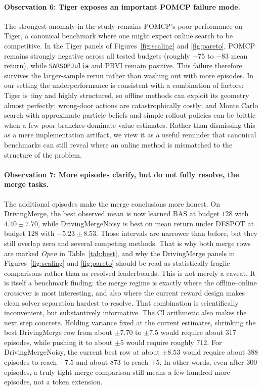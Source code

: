 \documentclass[10pt,twocolumn]{article}
\begin{document}
\paragraph{Observation 6: Tiger exposes an important POMCP failure mode.}
The strongest anomaly in the study remains POMCP's poor performance on Tiger, a canonical benchmark where one might expect online search to be competitive. In the Tiger panels of Figures~\ref{fig:scaling} and \ref{fig:pareto}, POMCP remains strongly negative across all tested budgets (roughly $-75$ to $-83$ mean return), while \texttt{SARSOPJulia} and PBVI remain positive. This failure therefore survives the larger-sample rerun rather than washing out with more episodes. In our setting the underperformance is consistent with a combination of factors: Tiger is tiny and highly structured, so offline methods can exploit its geometry almost perfectly; wrong-door actions are catastrophically costly; and Monte Carlo search with approximate particle beliefs and simple rollout policies can be brittle when a few poor branches dominate value estimates. Rather than dismissing this as a mere implementation artifact, we view it as a useful reminder that canonical benchmarks can still reveal where an online method is mismatched to the structure of the problem.

\paragraph{Observation 7: More episodes clarify, but do not fully resolve, the merge tasks.}
The additional episodes make the merge conclusions more honest. On DrivingMerge, the best observed mean is now learned BAS at budget $128$ with $4.40\pm7.70$, while DrivingMergeNoisy is best on mean return under DESPOT at budget $128$ with $-5.23\pm8.53$. Those intervals are narrower than before, but they still overlap zero and several competing methods. That is why both merge rows are marked \emph{Open} in Table~\ref{tab:best}, and why the DrivingMerge panels in Figures~\ref{fig:scaling} and \ref{fig:pareto} should be read as statistically fragile comparisons rather than as resolved leaderboards.
This is not merely a caveat. It is itself a benchmark finding: the merge regime is exactly where the offline--online crossover is most interesting, and also where the current reward design makes clean solver separation hardest to resolve. That combination is scientifically inconvenient, but substantively informative.
The CI arithmetic also makes the next step concrete. Holding variance fixed at the current estimates, shrinking the best DrivingMerge row from about $\pm 7.70$ to $\pm 7.5$ would require about $317$ episodes, while pushing it to about $\pm 5$ would require roughly $712$. For DrivingMergeNoisy, the current best row at about $\pm 8.53$ would require about $388$ episodes to reach $\pm 7.5$ and about $873$ to reach $\pm 5$. In other words, even after 300 episodes, a truly tight merge comparison still means a few hundred more episodes, not a token extension.
\end{document}
